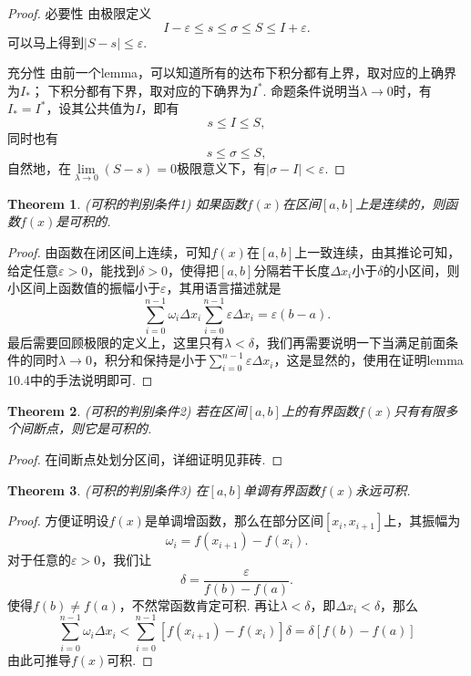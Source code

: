 \documentclass{article}
\newtheorem{theorem}{Theorem}[section]
\begin{document}
\begin{proof}
{\color{blue} 必要性} 由极限定义
$$
I-\varepsilon \leq s \leq \sigma \leq S \leq I+\varepsilon.
$$
可以马上得到$|S-s| \leq \varepsilon$.

{\color{blue} 充分性} 由前一个lemma，可以知道所有的达布下积分都有上界，取对应的上确界为$I_*$； 下积分都有下界，取对应的下确界为$I^*$. 命题条件说明当$\lambda \rightarrow 0$时，有$I_* = I^*$，设其公共值为$I$，即有
$$
s \leq I \leq S,
$$
同时也有
$$
s \leq \sigma \leq S,
$$
自然地，在$\lim\limits_{\lambda \rightarrow 0} (S-s) = 0$极限意义下，有$|\sigma -I| < \varepsilon$.
\end{proof}


\begin{theorem}
\rm {\color{red} (可积的判别条件1) }如果函数$f(x)$在区间$[a,b]$上是连续的，则函数$f(x)$是可积的.
\end{theorem}

\begin{proof}
由函数在闭区间上连续，可知$f(x)$在$[a,b]$上一致连续，由其推论可知，给定任意$\varepsilon > 0$，能找到$\delta > 0$，使得把$[a,b]$分隔若干长度$\Delta x_i$小于$\delta$的小区间，则小区间上函数值的振幅小于$\varepsilon$，其用语言描述就是
$$
\sum\limits_{i=0}^{n-1} \omega_i \Delta x_i  \sum\limits_{i=0}^{n-1} \varepsilon \Delta x_i = \varepsilon(b-a).
$$
最后需要回顾极限的定义上，这里只有$\lambda < \delta$，我们再需要说明一下当满足前面条件的同时$\lambda \rightarrow 0$，积分和保持是小于$\sum\limits_{i=0}^{n-1} \varepsilon \Delta x_i$，这是显然的，使用在证明lemma 10.4中的手法说明即可.
\end{proof}

\begin{theorem}
\rm {\color{red} (可积的判别条件2) } 若在区间$[a,b]$上的有界函数$f(x)$只有有限多个间断点，则它是可积的.
\end{theorem}

\begin{proof}
在间断点处划分区间，详细证明见菲砖.
\end{proof}

\begin{theorem}
\rm {\color{red} (可积的判别条件3) } 在$[a,b]$单调有界函数$f(x)$永远可积.
\end{theorem}

\begin{proof}
方便证明设$f(x)$是单调增函数，那么在部分区间$[x_i,x_{i+1}]$上，其振幅为
$$
\omega_i = f(x_{i+1})-f(x_{i}).
$$
对于任意的$\varepsilon > 0$，我们让
$$
\delta = \frac{\varepsilon}{f(b)-f(a)}.
$$
使得$f(b)\neq f(a)$，不然常函数肯定可积. 再让$\lambda < \delta$，即$\Delta x_i < \delta$，那么
$$
\sum\limits_{i=0}^{n-1}\omega_i\Delta x_i < \sum\limits_{i=0}^{n-1}\left[f(x_{i+1})-f(x_{i})\right] \delta = \delta\left[ f(b)-f(a) \right] 
$$
由此可推导$f(x)$可积.
\end{proof}
\end{document}
